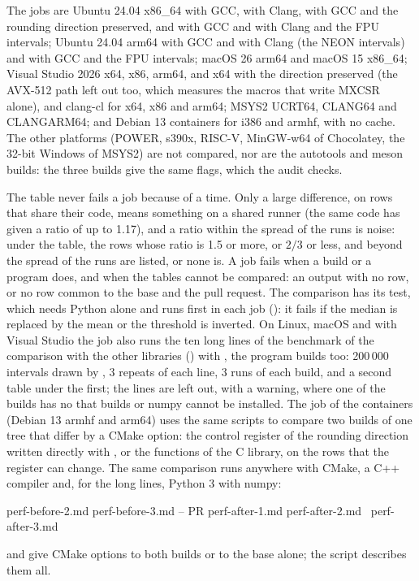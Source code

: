 \documentclass[12pt,a4paper,twoside,openright]{book}
\begin{document}
\noindent
The jobs are Ubuntu 24.04 x86\_64 with GCC, with Clang, with GCC and the
rounding direction preserved, and with GCC and with Clang and the FPU
intervals; Ubuntu 24.04 arm64 with GCC and with Clang (the NEON intervals)
and with GCC and the FPU intervals; macOS 26 arm64 and macOS 15 x86\_64;
Visual Studio 2026 x64, x86, arm64, and x64 with the direction preserved
(the AVX-512 path left out too, which measures the macros that write MXCSR
alone), and clang-cl for x64, x86 and arm64; MSYS2 UCRT64, CLANG64 and
CLANGARM64; and Debian 13 containers for i386 and armhf, with no cache. The
other platforms (POWER, s390x, RISC-V, MinGW-w64 of Chocolatey, the 32-bit
Windows of MSYS2) are not compared, nor are the autotools and meson builds:
the three builds give the same flags, which the audit checks.

\medskip
The table never fails a job because of a time. Only a large difference, on
rows that share their code, means something on a shared runner (the same
code has given a ratio of up to 1.17), and a ratio within the spread of the
runs is noise: under the table, the rows whose ratio is 1.5 or more, or
$2/3$ or less, and beyond the spread of the runs are listed, or none is. A
job fails when a build or a program does, and when the tables cannot be
compared: an output with no row, or no row common to the base and the pull
request. The comparison has its test, which needs Python alone and runs
first in each job (): it
fails if the median is replaced by the mean or the threshold is inverted. On
Linux, macOS and with Visual Studio the job also runs the ten long lines of
the benchmark of the comparison with the other libraries
() with , the program 
builds too: 200\,000 intervals drawn by , 3 repeats of each
line, 3 runs of each build, and a second table under the first; the lines
are left out, with a warning, where one of the builds has no
 that builds or numpy cannot be installed. The job
 of the containers (Debian 13 armhf and
arm64) uses the same scripts to compare two builds of one tree that differ
by a CMake option: the control register of the rounding direction written
directly with , or the functions of the C
library, on the rows that the register can change. The same comparison runs
anywhere with CMake, a C++ compiler and, for the long lines, Python 3 with
numpy:
\begin{cmdshell}
    perf-before-2.md perf-before-3.md -- PR perf-after-1.md perf-after-2.md \
    perf-after-3.md
\end{cmdshell}
 and  give CMake options to
both builds or to the base alone; the script describes them all.
\end{document}
